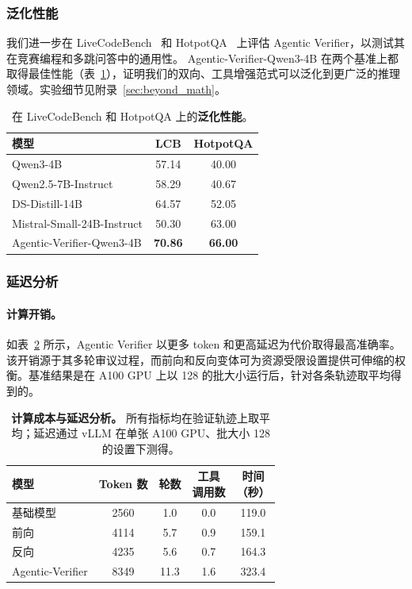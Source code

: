 \documentclass[11pt]{article}
\begin{document}
\subsubsection{泛化性能}
我们进一步在 LiveCodeBench~\cite{jain2024livecodebench} 和 HotpotQA~\cite{yang2018hotpotqa} 上评估 Agentic Verifier，以测试其在竞赛编程和多跳问答中的通用性。
Agentic-Verifier-Qwen3-4B 在两个基准上都取得最佳性能（表~\ref{tab:generalization}），证明我们的双向、工具增强范式可以泛化到更广泛的推理领域。实验细节见附录~\ref{sec:beyond_math}。

\begin{table}[t]
\centering
\small
\setlength{\tabcolsep}{10pt}
\begin{tabular}{lcc}
\toprule
模型 & LCB & HotpotQA \\
\midrule
Qwen3-4B & 57.14 & 40.00 \\
Qwen2.5-7B-Instruct & 58.29 & 40.67 \\
DS-Distill-14B & 64.57 & 52.05 \\
Mistral-Small-24B-Instruct & 50.30 & 63.00 \\
Agentic-Verifier-Qwen3-4B & \textbf{70.86} & \textbf{66.00} \\
\bottomrule
\end{tabular}
\caption{在 LiveCodeBench 和 HotpotQA 上的\textbf{泛化性能}。}
\label{tab:generalization}
\end{table}

\subsubsection{延迟分析}
\paragraph{计算开销。} 如表~\ref{tab:latency} 所示，Agentic Verifier 以更多 token 和更高延迟为代价取得最高准确率。该开销源于其多轮审议过程，而前向和反向变体可为资源受限设置提供可伸缩的权衡。基准结果是在 A100 GPU 上以 128 的批大小运行后，针对各条轨迹取平均得到的。

\begin{table}[t]
\centering
\small
\setlength{\tabcolsep}{2.6pt}
\begin{tabular}{lcccc}
\toprule
模型 & Token 数 & 轮数 & \makecell{工具\\调用数} & \makecell{时间\\（秒）} \\
\midrule
基础模型 & 2560 & 1.0 & 0.0 & 119.0 \\
前向 & 4114 & 5.7 & 0.9 & 159.1 \\
反向 & 4235 & 5.6 & 0.7 & 164.3 \\
Agentic-Verifier & 8349 & 11.3 & 1.6 & 323.4 \\
\bottomrule
\end{tabular}
\caption{
\textbf{计算成本与延迟分析。}
所有指标均在验证轨迹上取平均；延迟通过 vLLM 在单张 A100 GPU、批大小 128 的设置下测得。
}
\label{tab:latency}
\vspace{-2mm}
\end{table}
\end{document}
